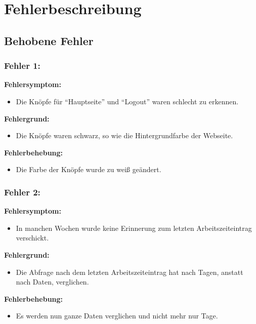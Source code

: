 \section{Fehlerbeschreibung}

\subsection{Behobene Fehler}

\subsubsection{Fehler 1:} %
\textbf{Fehlersymptom:}
	\begin{itemize}
		\item Die Knöpfe für "`Hauptseite"' und "`Logout"' waren schlecht zu erkennen.
	\end{itemize}
\textbf{Fehlergrund:}
	\begin{itemize}
		\item Die Knöpfe waren schwarz, so wie die Hintergrundfarbe der Webseite.
	\end{itemize}
\textbf{Fehlerbehebung:}
	\begin{itemize}
		\item Die Farbe der Knöpfe wurde zu weiß geändert.
	\end{itemize}

\subsubsection{Fehler 2:} %
\textbf{Fehlersymptom:}
	\begin{itemize}
		\item In manchen Wochen wurde keine Erinnerung zum letzten Arbeitszeiteintrag verschickt.
	\end{itemize}
\textbf{Fehlergrund:}
	\begin{itemize}
		\item Die Abfrage nach dem letzten Arbeitszeiteintrag hat nach Tagen, anstatt nach Daten, verglichen.
	\end{itemize}
\textbf{Fehlerbehebung:}
	\begin{itemize}
		\item Es werden nun ganze Daten verglichen und nicht mehr nur Tage.
	\end{itemize}

